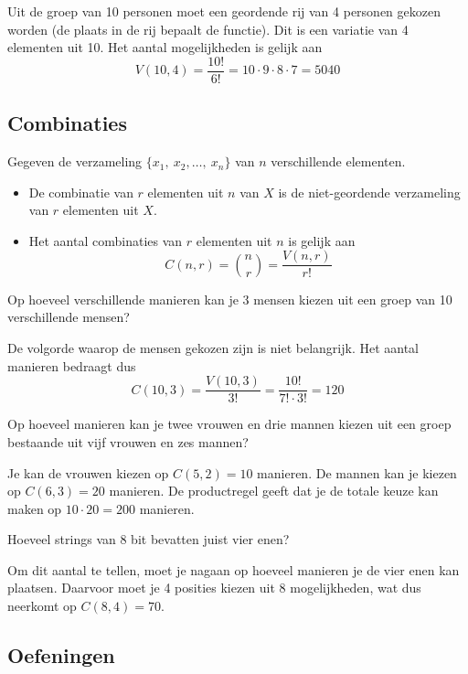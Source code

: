 Uit de groep van 10 personen moet een geordende rij van 4 personen gekozen worden (de plaats in de rij bepaalt de functie). Dit is een variatie van 4 elementen uit 10. Het aantal mogelijkheden is gelijk aan 
\[
V(10,4)=\frac{10!}{6!}=10\cdot9\cdot8\cdot7=5040
\]

\subsection{Combinaties}
Gegeven de verzameling $\{x_1,~x_2,\dots,~x_n\}$ van $n$ verschillende elementen.
\begin{itemize}
\item De combinatie van $r$ elementen uit $n$ van $X$ is de niet-geordende verzameling van $r$ elementen uit $X$.
\item Het aantal combinaties van $r$ elementen uit $n$ is gelijk aan \[C(n,r)={n \choose r}=\frac {V(n,r)}{r!}\]
\end{itemize}

\voorbeeld
Op hoeveel verschillende manieren kan je 3 mensen kiezen uit een groep van 10 verschillende mensen?

De volgorde waarop de mensen gekozen zijn is niet belangrijk. Het aantal manieren bedraagt dus
\[
C(10,3)=\frac{V(10,3)}{3!}=\frac{10!}{7!\cdot3!}=120
\]

\voorbeeld
Op hoeveel manieren kan je twee vrouwen en drie mannen kiezen uit een groep bestaande uit vijf vrouwen en zes mannen?

Je kan de vrouwen kiezen op $C(5,2)=10$ manieren. De mannen kan je kiezen op $C(6,3)=20$ manieren. De productregel geeft dat je de totale keuze kan maken op $10\cdot 20=200$ manieren.

\voorbeeld
Hoeveel strings van 8 bit bevatten juist vier enen?

Om dit aantal te tellen, moet je nagaan op hoeveel manieren je de vier enen kan plaatsen. Daarvoor moet je 4 posities kiezen uit 8 mogelijkheden, wat dus neerkomt op $C(8,4)=70$.

\subsection{Oefeningen}

